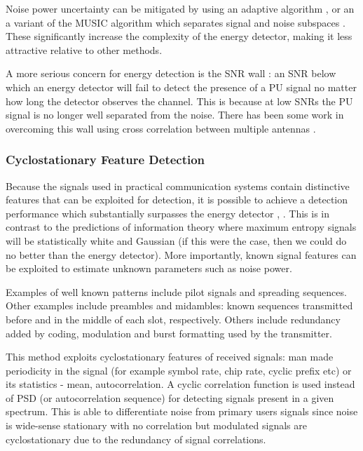Noise power uncertainty can be mitigated by using an adaptive algorithm \cite{zhang2011adaptive}, or an a variant of the MUSIC algorithm which separates signal and noise subspaces \cite{olivieri2005scalable}. These significantly increase the complexity of the energy detector, making it less attractive relative to other methods.

A more serious concern for energy detection is the SNR wall \cite{tandra2008snr}: an SNR below which an energy detector will fail to detect the presence of a PU signal no matter how long the detector observes the channel. This is because at low SNRs the PU signal is no longer well separated from the noise. There has been some work in overcoming this wall using cross correlation between multiple antennas \cite{oude2011lowering}.


\subsubsection{Cyclostationary Feature Detection}
Because the signals used in practical communication systems contain distinctive features that can be exploited for detection, it is possible to achieve a detection performance which substantially surpasses the energy detector \cite{ye2007spectrum}, \cite{kim2007cyclostationary}. This is in contrast to the predictions of information theory where maximum entropy signals will be statistically white and Gaussian (if this were the case, then we could do no better than the energy detector). More importantly, known signal features can be exploited to estimate unknown parameters such as noise power. 

Examples of well known patterns include pilot signals and spreading sequences. Other examples include preambles and midambles: known sequences transmitted before and in the middle of each slot, respectively. Others include redundancy added by coding, modulation and burst formatting used by the transmitter. 

This method exploits cyclostationary features of received signals: man made periodicity in the signal (for example symbol rate, chip rate, cyclic prefix etc) or its statistics - mean, autocorrelation. A cyclic correlation function is used instead of PSD (or autocorrelation sequence) for detecting signals present in a given spectrum. This is able to differentiate noise from primary users signals since noise is wide-sense stationary with no correlation but modulated signals are cyclostationary due to the redundancy of signal correlations. 

